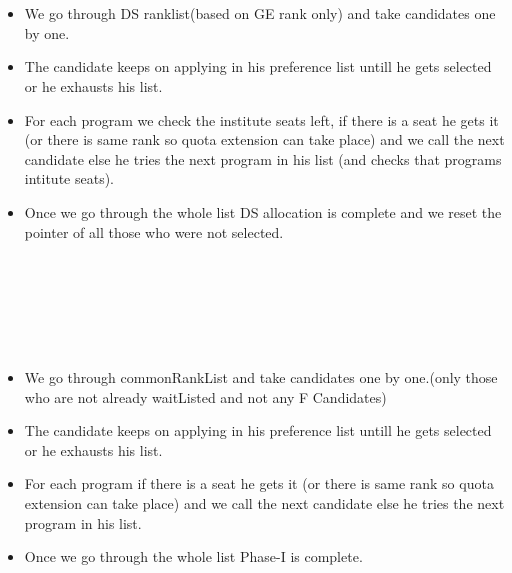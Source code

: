 \documentclass{article}
\begin{document}
\hspace*{5 mm} \\
\hspace*{5 mm}{\LARGE Initially DS allocation takes place:}
\hspace*{5 mm} \\
\begin{itemize}
  \item We go through DS ranklist(based on GE rank only) and take candidates one by one. 
  \item The candidate keeps on applying in his preference list untill he gets selected or he exhausts his list.
  \item For each program we check the institute seats left, if there is a seat he gets it (or there is same rank so quota extension can take place) and we call the next candidate else he tries the next program in his list (and checks that programs intitute seats).
  \item Once we go through the whole list DS allocation is complete and we reset the pointer of all those who were not selected.
\end{itemize}
\hspace*{5 mm} \\
\hspace*{5 mm} \\
\hspace*{5 mm} \\
\hspace*{5 mm} \\
\hspace*{5 mm}{\LARGE Now Phase-I allocation takes place:}
\hspace*{5 mm} \\
\begin{itemize}
  \item We go through commonRankList and take candidates one by one.(only those who are not already waitListed and not any F Candidates) 
  \item The candidate keeps on applying in his preference list untill he gets selected or he exhausts his list.
  \item For each program if there is a seat he gets it (or there is same rank so quota extension can take place) and we call the next candidate else he tries the next program in his list.
  \item Once we go through the whole list Phase-I is complete.
\end{itemize}
\pagebreak
\hspace*{5 mm} \\
\end{document}
